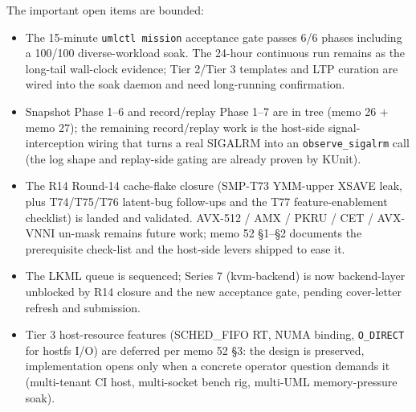 The important open items are bounded:
\begin{itemize}
  \item The 15-minute \texttt{umlctl mission} acceptance gate
        passes 6/6 phases including a 100/100 diverse-workload soak.
        The 24-hour continuous run remains as the long-tail
        wall-clock evidence; Tier 2/Tier 3 templates and LTP curation
        are wired into the soak daemon and need long-running confirmation.
  \item Snapshot Phase 1--6 and record/replay Phase 1--7 are in
        tree (memo 26 + memo 27); the remaining record/replay work
        is the host-side signal-interception wiring that turns a
        real SIGALRM into an \texttt{observe\_sigalrm} call (the
        log shape and replay-side gating are already proven by KUnit).
  \item The R14 Round-14 cache-flake closure (SMP-T73 YMM-upper
        XSAVE leak, plus T74/T75/T76 latent-bug follow-ups and the
        T77 feature-enablement checklist) is landed and validated.
        AVX-512 / AMX / PKRU / CET / AVX-VNNI un-mask remains
        future work; memo 52 §1--§2 documents the prerequisite
        check-list and the host-side levers shipped to ease it.
  \item The LKML queue is sequenced; Series 7 (kvm-backend) is now
        backend-layer unblocked by R14 closure and the new acceptance
        gate, pending cover-letter refresh and submission.
  \item Tier 3 host-resource features (SCHED\_FIFO RT, NUMA binding,
        \texttt{O\_DIRECT} for hostfs I/O) are deferred per memo 52 §3:
        the design is preserved, implementation opens only when a
        concrete operator question demands it (multi-tenant CI host,
        multi-socket bench rig, multi-UML memory-pressure soak).
\end{itemize}
